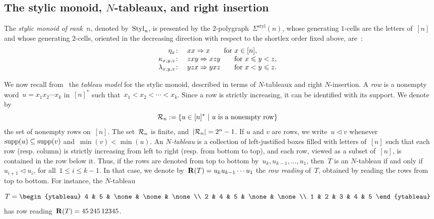 \documentclass[a4paper, twoside, 11pt, english]{article}
\begin{document}
\subsection{The stylic monoid, $N$-tableaux, and right insertion}
\label{SS:StylicMonoid}

The \emph{stylic monoid of rank~$n$}, denoted by~$\mathrm{Styl}_n$, is presented by
the $2$-polygraph~$\Sigma^{\mathrm{styl}}(n)$, whose generating $1$-cells
are the letters of~$[n]$ and whose generating $2$-cells, oriented in the
decreasing direction with respect to the shortlex order fixed above, are~\cite{AbramReutenauerStylic}:
\[
\begin{array}{rl}
\eta_x\colon& xx\Rightarrow x
\qquad
\text{for }x\in[n],\\
\kappa_{x,y,z}\colon& zxy\Rightarrow xzy
\qquad
\text{for }x\leqslant y<z,\\
\lambda_{x,y,z}\colon& yzx\Rightarrow yxz
\qquad
\text{for }x<y\leqslant z.
\end{array}
\]

We now recall from~\cite{AbramReutenauerStylic} the \emph{tableau model} for the
stylic monoid, described in terms of $N$-tableaux and right $N$-insertion.
A \emph{row} is a nonempty word~$u=x_1x_2\cdots x_k$
in~$[n]^\ast$ such that~$x_1<x_2<\cdots<x_k$.
Since a row is strictly increasing, it can be identified with its support.
We denote by
\[
\mathcal{R}_n
:=
\left\{
u\in[n]^\ast
\ \middle|\
u\text{ is a nonempty row}
\right\}
\]
the set of nonempty rows on~$[n]$.
The set~$\mathcal{R}_n$ is finite, and~$|\mathcal{R}_n|=2^n-1$.
If $u$ and $v$ are rows, we write~$u\triangleleft v$
whenever~$\operatorname{supp}(u)\subseteq \operatorname{supp}(v)$ and~$\min(v)<\min(u)$.
An \emph{$N$-tableau} is a collection of left-justified boxes filled with letters of~$[n]$
such that each row (resp. column) is strictly increasing from left to right (resp. from bottom to top), and each row, viewed as a subset of~$[n]$, is contained in the row below it.
Thus, if the rows are denoted from top to bottom by~$u_k,u_{k-1},\dots,u_1$,
then~$T$ is an $N$-tableau if and only if~$u_{i+1}\triangleleft u_i$, for all~$1\le i\le k-1$.
In that case, we denote by~$\mathbf{R}(T)=u_k u_{k-1}\cdots u_1$
the \emph{row reading} of~$T$, obtained by reading the rows from top to bottom.
For instance, the $N$-tableau

\begin{equation}
\label{eq:Ntableau}
T=
\begin{ytableau}
4 & 5 & \none & \none & \none \\
2 & 4 & 5 & \none & \none \\
1 & 2 & 3 & 4 & 5
\end{ytableau}
\end{equation}
has row reading~$\mathbf{R}(T)=45\,245\,12345$.
\end{document}
